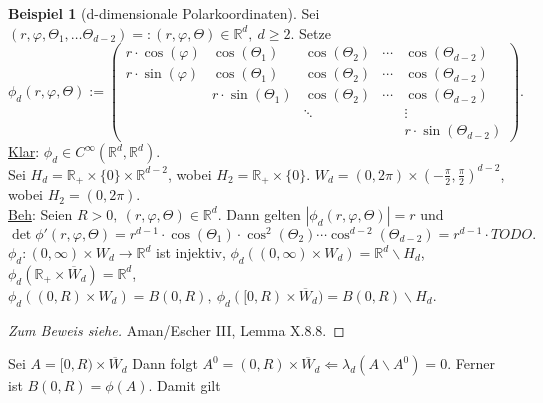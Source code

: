 \documentclass[a4paper]{scrreprt}
\newcommand{\R}{\mathbb{R}}
\newcommand{\jlabel}[1]{\label{j_#1}}
\newcommand{\jabb}[3]{ #1: #2 \rightarrow #3 }
\theoremstyle{plain}
\theoremstyle{definition}
\newtheorem{expl}[thm]{Beispiel}
\begin{document}
{{{{\begin{expl}[d-dimensionale Polarkoordinaten]
    \jlabel{Bsp 3.35}
    Sei $(r, \varphi, \Theta_1,\dots \Theta_{d-2}) =: (r,\varphi, \Theta) \in \R^d, \ d\ge 2$. Setze
    \begin{equation}
        \jlabel{(3.8)}
        \phi_d(r,\varphi,\Theta) := \begin{pmatrix}
                                            r\cdot \cos(\varphi) & \cos(\Theta_1)        & \cos(\Theta_2) & \cdots & \cos(\Theta_{d-2})\\
                                            r\cdot \sin(\varphi) & \cos(\Theta_1)        & \cos(\Theta_2) & \cdots & \cos(\Theta_{d-2})\\
                                                                 & r\cdot \sin(\Theta_1) & \cos(\Theta_2) & \cdots & \cos(\Theta_{d-2})\\
                                                                 &                       & \ddots         &        & \vdots \\
                                                                 &                       &                &        & r\cdot \sin(\Theta_{d-2})
                                        \end{pmatrix}.
    \end{equation}
    \uline{Klar}: $\phi_d \in C^\infty(\R^d, \R^d)$.\\
    Sei $H_d = \R_+\times \{0\} \times \R^{d-2}$, wobei $H_2 = \R_+\times \{0\}$. $W_d = (0,2\pi)\times(-\frac{\pi}{2}, \frac{\pi}{2})^{d-2}$, wobei $H_2 = (0,2\pi)$.\\
    \uline{Beh}: Seien $R>0,\ (r, \varphi, \Theta) \in \R^d$. Dann gelten $|\phi_d(r,\varphi, \Theta)| = r$ und
    \[
        \det \phi'(r,\varphi, \Theta) = r^{d-1}\cdot \cos(\Theta_1)\cdot \cos^2(\Theta_2)\cdots \cos^{d-2}(\Theta_{d-2}) = r^{d-1} \cdot TODO.
    \]
    $\jabb{\phi_d}{(0,\infty)\times W_d}{\R^d}$ ist injektiv, $\phi_d((0,\infty)\times W_d) = \R^d\backslash H_d$,\\
    $\phi_d(\R_+\times \overline{W}_d) = \R^d$, $\phi_d((0,R)\times W_d) = B(0,R), \ \phi_d([0,R)\times \overline{W}_d) = B(0,R)\backslash H_d$.
    \begin{proof}[Zum Beweis siehe]
        Aman/Escher III, Lemma X.8.8.
    \end{proof}
    Sei $A = [0,R)\times \overline{W}_d$ Dann folgt $A^0 = (0,R)\times \overline{W}_d \Leftarrow \lambda_d(A\backslash A^0) = 0$. Ferner ist $B(0,R) = \phi(A)$. Damit gilt

\end{expl}}}}}
\end{document}
